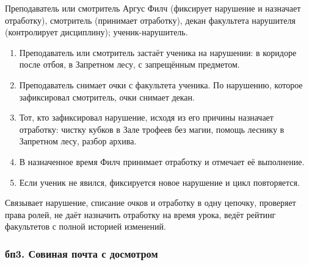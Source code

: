 \documentclass[a4paper,12pt]{article}
\begin{document}
\begin{description}[leftmargin=0pt,labelindent=0pt,style=nextline]
\item[Участники] Преподаватель или смотритель Аргус Филч (фиксирует нарушение
  и назначает отработку), смотритель (принимает отработку), декан факультета
  нарушителя (контролирует дисциплину); ученик-нарушитель.
\item[Ход процесса]\leavevmode
  \begin{enumerate}
    \item Преподаватель или смотритель застаёт ученика на нарушении: в коридоре после отбоя, в Запретном лесу, с запрещённым предметом.
    \item Преподаватель снимает очки с факультета ученика. По нарушению, которое зафиксировал смотритель, очки снимает декан.
    \item Тот, кто зафиксировал нарушение, исходя из его причины назначает отработку: чистку кубков в Зале трофеев без магии, помощь леснику в Запретном лесу, разбор архива.
    \item В назначенное время Филч принимает отработку и отмечает её выполнение.
    \item Если ученик не явился, фиксируется новое нарушение и цикл повторяется.
  \end{enumerate}
 
\item[Роль ИС] Связывает нарушение, списание очков и отработку в одну цепочку,
  проверяет права ролей, не даёт назначить отработку на время урока,
  ведёт рейтинг факультетов с полной историей изменений.
\end{description}
 
\subsubsection*{бп3. Совиная почта с досмотром}
 
\end{document}
